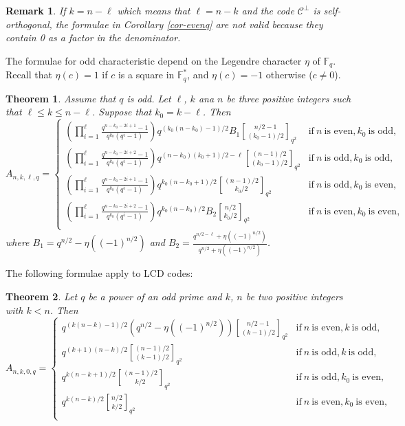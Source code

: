 \documentclass[a4paper,11pt]{article}
\newtheorem{theorem}{Theorem}
\newtheorem{remark}{Remark}
\newcommand{\F}{\mathbb{F}}
\begin{document}
\begin{remark} If $k=n-\ell$ which means that $\ell=n-k$ and the code $\mathcal{C}^\perp$ is self-orthogonal, the formulae in Corollary \ref{cor-evenq} are not valid because they contain 0 as a factor in the denominator.
\end{remark}


The formulae for odd characteristic depend on the Legendre character $\eta$ of $\F_q$. Recall that $\eta(c)=1$ if $c$ is a square in $\F_q^*$, and $\eta(c)=-1$ otherwise ($c\neq 0$).

\begin{theorem}\cite[Theorem 4.12]{LiShiLing} \label{theorem.Li et al.odd} Assume that $q$ is odd. Let $\ell$, $k$ ana $n$ be three positive integers such that $\ell\le k\le n-\ell$. Suppose that $k_0=k-\ell$. Then
\begin{equation}\label{oddq}
A_{n,k,\ell,q}=\left\{\begin{array}{ll}
\left(\prod_{i=1}^\ell\frac{q^{n-k_0-2i+1}-1}{q^{k_0}(q^i-1)}\right)q^{(k_0(n-k_0)-1)/2}B_1{n/2-1\brack(k_0-1)/2 }_{q^2}&\mbox{if} \ n \ \mbox{is even}, k_0 \ \mbox{is odd},\\
\left(\prod_{i=1}^{\ell}\frac{q^{n-k_0-2i+2}-1}{q^{k_0}(q^i-1)}\right)q^{(n-k_0)(k_0+1)/2-\ell}{(n-1)/2\brack(k_0-1)/2 }_{q^2}&\mbox{if} \ n \ \mbox{is odd}, k_0 \ \mbox{is odd},\\
\left(\prod_{i=1}^\ell\frac{q^{n-k_0-2i+1}-1}{q^{k_0}(q^i-1)}\right)q^{k_0(n-k_0+1)/2}{(n-1)/2\brack k_0/2 }_{q^2}&\mbox{if} \ n \ \mbox{is odd}, k_0 \ \mbox{is even},\\
\left(\prod_{i=1}^{\ell}\frac{q^{n-k_0-2i+2}-1}{q^{k_0}(q^i-1)}\right)q^{k_0(n-k_0)/2}B_2{n/2\brack k_0/2 }_{q^2}&\mbox{if} \ n \ \mbox{is even}, k_0 \ \mbox{is even},\\
\end{array}\right.
\end{equation}
where $B_1=q^{n/2}-\eta((-1)^{n/2})$ and $B_2=\frac{q^{n/2-\ell}+\eta((-1)^{n/2})}{q^{n/2}+\eta((-1)^{n/2})}$.
\end{theorem}

The following formulae apply to LCD codes:

\begin{theorem} \cite[Corollary 32]{CarletLCD2019} Let $q$ be a power of an odd prime and $k$, $n$
be two positive integers with $k < n$. Then
\[
A_{n,k,0,q}=\left\{\begin{array}{ll}
q^{(k(n-k)-1)/2}(q^{n/2}-\eta((-1)^{n/2})){n/2-1\brack(k-1)/2 }_{q^2}&\mbox{if} \ n \ \mbox{is even}, k \ \mbox{is odd},\\
q^{(k+1)(n-k)/2}{(n-1)/2\brack(k-1)/2 }_{q^2}&\mbox{if} \ n \ \mbox{is odd}, k \ \mbox{is odd},\\
q^{k(n-k+1)/2}{(n-1)/2\brack k/2 }_{q^2}&\mbox{if} \ n \ \mbox{is odd}, k_0 \ \mbox{is even},\\
q^{k(n-k)/2}{n/2\brack k/2 }_{q^2}&\mbox{if} \ n \ \mbox{is even}, k_0 \ \mbox{is even},\\
\end{array}\right.
\]
\end{theorem}
\end{document}

